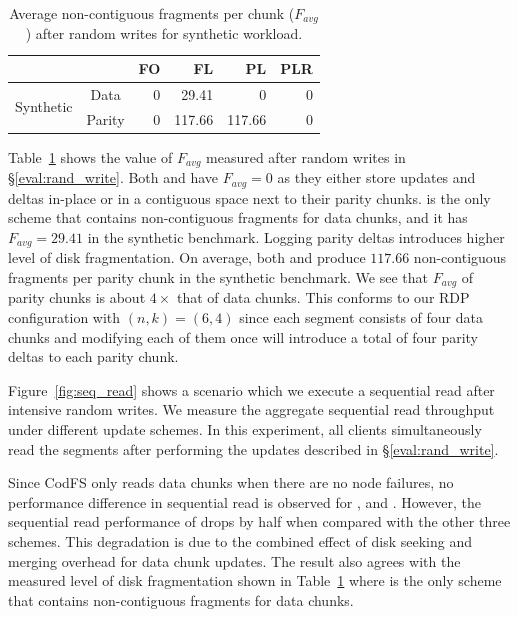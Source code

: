 \begin{table}[t]
  \centering
        \begin{tabular}{ccrrrr}
        \toprule
        & & FO    & FL    & PL    & PLR \\ \hline
        \multirow{2}[0]{*}{Synthetic} & Data  & 0     & 29.41 & 0     & 0 \\ \vspace{-1.1pt}
              & Parity & 0     & 117.66 & 117.66 & 0 \\ 
        \bottomrule
        \end{tabular}%
        \caption{Average non-contiguous fragments per chunk 
            ($F_{avg}$) after random writes for synthetic workload.}
  \label{table:synthetic_fragmentation}%
\end{table}%

Table~\ref{table:synthetic_fragmentation} shows the value of $F_{avg}$
measured after random writes in \S\ref{eval:rand_write}.  Both \FO and \PLR have $F_{avg} = 0$
as they either store updates and deltas in-place or in a contiguous space next
to their parity chunks.  \FL is the only scheme that contains
non-contiguous fragments for data chunks, and it has $F_{avg} = 29.41$ in the
synthetic benchmark. 
Logging parity deltas introduces higher level of disk fragmentation. On
average, both \FL and \PL produce $117.66$ non-contiguous fragments per parity
chunk in the synthetic benchmark. We see that $F_{avg}$ of parity chunks is
about $4\times$ that of data chunks. This conforms to our RDP configuration
with $(n,k)=(6,4)$ since each segment consists of four data chunks and modifying
each of them once will introduce a total of four parity deltas to each parity
chunk. 

Figure~\ref{fig:seq_read} shows a scenario which we execute a sequential read
after intensive random writes. We measure the aggregate sequential read
throughput under different update schemes.  In this experiment, all clients
simultaneously read the segments after performing the updates described in
\S\ref{eval:rand_write}.

Since CodFS only reads data chunks when there are no node failures, no
performance difference in sequential read is observed for \FO, \PL and \PLR.
However,  the sequential read performance of \FL drops by half when
compared with the other three schemes. This degradation is due to the combined
effect of disk seeking and merging overhead for data chunk updates. The result
also agrees with the measured level of disk fragmentation shown in
Table~\ref{table:synthetic_fragmentation} where \FL is the only scheme that
contains non-contiguous fragments for data chunks.

